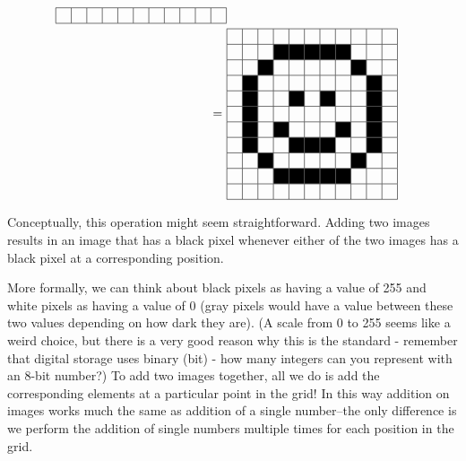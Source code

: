 \begin{align}
\begin{tabular}{|c|c|c|c|c|c|c|c|c|c|c|}
\hline
 &   &  &  & & & & & & & \\
 \hline
\end{tabular} \nonumber \\
=~&\begin{tabular}{|c|c|c|c|c|c|c|c|c|c|c|}
\hline
 &   &  &  & & & & & & & \\
 \hline
&    &   & \cellcolor{black}   & \cellcolor{black}   & \cellcolor{black}   & \cellcolor{black}  & \cellcolor{black}  & & & \\
 \hline
 &   &  \cellcolor{black} & & & & & & \cellcolor{black} & &    \\
 \hline
  &   \cellcolor{black} & & & & & & & & \cellcolor{black} &    \\
   \hline
    &   \cellcolor{black} & & & \cellcolor{black} & & \cellcolor{black}& & & \cellcolor{black} &    \\
     \hline
  &   \cellcolor{black} & & & & & & & & \cellcolor{black} &    \\
 \hline
  &   \cellcolor{black} & &\cellcolor{black}  & & & & \cellcolor{black} & & \cellcolor{black} &    \\
   \hline
  &   \cellcolor{black} & & & \cellcolor{black} & \cellcolor{black}  & \cellcolor{black} & & & \cellcolor{black} &    \\
\hline
 &   &  \cellcolor{black} & & & & & & \cellcolor{black} & &    \\
 \hline
 &    &   & \cellcolor{black}   & \cellcolor{black}   & \cellcolor{black}   & \cellcolor{black}  & \cellcolor{black}  & & & \\
\hline
 &   &  &  & & & & & & & \\
 \hline
\end{tabular} \nonumber 
\end{align}

Conceptually, this operation might seem straightforward.  Adding two images results in an image that has a black pixel whenever either of the two images has a black pixel at a corresponding position.

More formally, we can think about black pixels as having a value of 255 and white pixels as having a value of 0 (gray pixels would have a value between these two values depending on how dark they are). (A scale from 0 to 255 seems like a weird choice, but there is a very good reason why this is the standard - remember that digital storage uses binary (bit) - how many integers can you represent with an 8-bit number?)  To add two images together, all we do is add the corresponding elements at a particular point in the grid!  In this way addition on images works much the same as addition of a single number--the only difference is we perform the addition of single numbers multiple times for each position in the grid.

